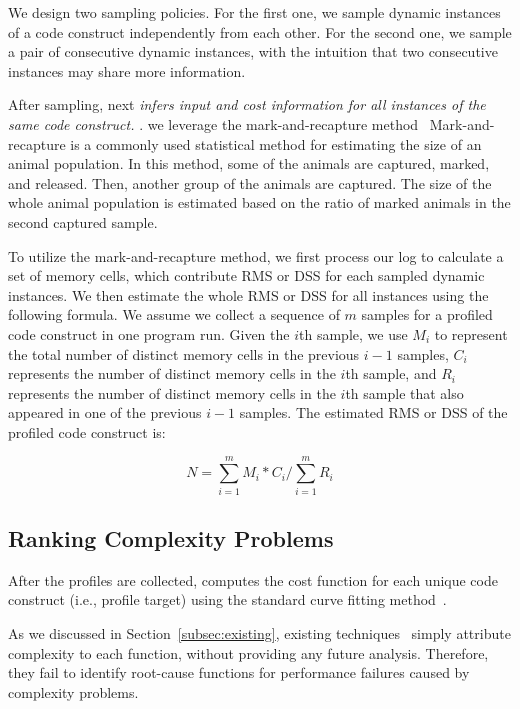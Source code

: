 We design two sampling policies. 
For the first one, we sample dynamic instances of a code construct 
independently from each other.
For the second one, we sample a pair of consecutive dynamic instances, 
with the intuition that two consecutive 
instances may share more information.


After sampling, \Tool next \emph{infers input and cost information
for all instances of the same code construct.} 
.  
we leverage the mark-and-recapture method~\cite{mark-recapture} 
Mark-and-recapture is a commonly used statistical method 
for estimating the size of an animal population. 
In this method, some of the animals are captured, marked, and released. 
Then, another group of the animals are captured.
The size of the whole animal population is estimated 
based on the ratio of marked animals in the second captured sample. 
 

To utilize the mark-and-recapture method, 
we first process our log to calculate a set of memory cells, 
which contribute RMS
or DSS for each sampled dynamic instances. 
We then estimate the whole RMS or DSS for all instances using the following formula.
We assume we collect a sequence of $m$ samples for a profiled code construct 
in one program run.
Given the $i$th sample, we use $M_i$ to represent the 
total number of distinct memory cells in the previous $i-1$ samples, 
$C_i$ represents the number of distinct memory cells in the $i$th sample,
and $R_i$ represents the number of distinct memory cells in 
the $i$th sample that also appeared in one of the previous $i-1$ samples.
The estimated RMS or DSS of the profiled code construct is:

\begin{equation} \label{eq:mark}
N = \sum\limits_{i=1}^m M_i*C_i\Big/\sum\limits_{i=1}^m R_i
\end{equation}

\subsection{Ranking Complexity Problems}

After the profiles are collected, \Tool computes
the cost function for each unique code construct
(i.e., profile target) using the standard curve fitting 
method~\cite{curve-fitting,curve-bounding}. 

 
As we discussed in Section~\ref{subsec:existing}, 
existing techniques~\cite{Aprof1,Aprof2,AlgoProf} 
simply attribute complexity to each function, 
without providing any future analysis. 
Therefore, they fail to identify root-cause functions for 
performance failures caused by complexity problems. 


